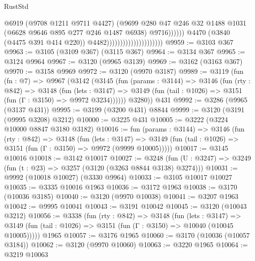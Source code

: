 \begin{lexlean}{RustStd}
\begin{coremodule}
                                                        @6919
                                                        (@9708 @1211 @9711 @4427)
                                                        (@9699
                                                          @280
                                                          @47
                                                          @246
                                                          @32
                                                          @1488
                                                          @1031
                                                          (@6628 @9646 @895 @277 @246 @1487 @6938)
                                                          @9716))))))
                                              @4470
                                              (@3840 (@4475 @391 @414 @220))
                                              @4482)))))))))))))))))))))
@9959 := @3103 @367
@9963 := @3105 (@3109 @367) (@3115 @367)
@9964 := @3134 @367
@9965 := @3124 @9964
@9967 := @3120 (@9965 @3139)
@9969 := @3162 (@3163 @367)
@9970 := @3158 @9969
@9972 := @3120 (@9970 @3187)
@9989 := @3119
    (fun (fn : @7) =>
    @9967
      (@3142
        (@3145
          (fun (params : @3144) =>
          @3146
            (fun (rty : @842) =>
            @3148
              (fun (lets : @3147) =>
              @3149 (fun (tail : @1026) => @3151 (fun (Γ : @3150) => @9972 @3234))))))
        @3280))
    @431
@9992 := @3286 (@9965 (@3137 @431))
@9995 := @3199 (@3200 @431) @8844
@9999 := @3120 (@3191 (@9995 @3208) @3212)
@10000 := @3225 @431
@10005 := @3222 (@3224 @10000 @8847 @3180 @3182)
@10016 := fun (params : @3144) =>
  @3146
    (fun (rty : @842) =>
    @3148
      (fun (lets : @3147) =>
      @3149 (fun (tail : @1026) => @3151 (fun (Γ : @3150) => @9972 (@9999 @10005)))))
@10017 := @3145 @10016
@10018 := @3142 @10017
@10027 := @3248
    (fun (U : @3247) => @3249 (fun (t : @23) => @3257 (@3120 (@3263 @8844 @3138) @3274)))
@10031 := @9992 (@10018 @10027) (@3330 @9964)
@10033 := @3105 @10017 @10027
@10035 := @3335 @10016 @1963
@10036 := @3172 @1963
@10038 := @3170 (@10036 @3185)
@10040 := @3120 (@9970 @10038)
@10041 := @3207 @1963
@10042 := @9995 @10041
@10043 := @3191 @10042
@10045 := @3120 (@10043 @3212)
@10056 := @3338
    (fun (rty : @842) =>
    @3148
      (fun (lets : @3147) =>
      @3149 (fun (tail : @1026) => @3151 (fun (Γ : @3150) => @10040 (@10045 @10005)))))
    @1965
@10057 := @3176 @1965
@10060 := @3170 (@10036 (@10057 @3184))
@10062 := @3120 (@9970 @10060)
@10063 := @3220 @1965
@10064 := @3219 @10063

\end{coremodule}
\end{lexlean}
